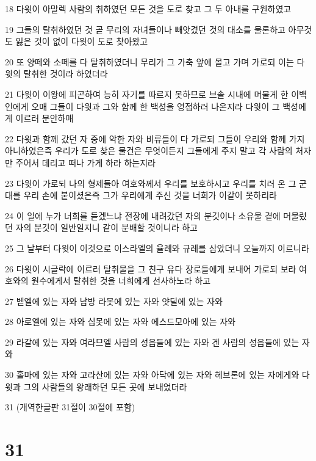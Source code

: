 \par 18 다윗이 아말렉 사람의 취하였던 모든 것을 도로 찾고 그 두 아내를 구원하였고
\par 19 그들의 탈취하였던 것 곧 무리의 자녀들이나 빼앗겼던 것의 대소를 물론하고 아무것도 잃은 것이 없이 다윗이 도로 찾아왔고
\par 20 또 양떼와 소떼를 다 탈취하였더니 무리가 그 가축 앞에 몰고 가며 가로되 이는 다윗의 탈취한 것이라 하였더라
\par 21 다윗이 이왕에 피곤하여 능히 자기를 따르지 못하므로 브솔 시내에 머물게 한 이백인에게 오매 그들이 다윗과 그와 함께 한 백성을 영접하러 나온지라 다윗이 그 백성에게 이르러 문안하매
\par 22 다윗과 함께 갔던 자 중에 악한 자와 비류들이 다 가로되 그들이 우리와 함께 가지 아니하였은즉 우리가 도로 찾은 물건은 무엇이든지 그들에게 주지 말고 각 사람의 처자만 주어서 데리고 떠나 가게 하라 하는지라
\par 23 다윗이 가로되 나의 형제들아 여호와께서 우리를 보호하시고 우리를 치러 온 그 군대를 우리 손에 붙이셨은즉 그가 우리에게 주신 것을 너희가 이같이 못하리라
\par 24 이 일에 누가 너희를 듣겠느냐 전장에 내려갔던 자의 분깃이나 소유물 곁에 머물렀던 자의 분깃이 일반일지니 같이 분배할 것이니라 하고
\par 25 그 날부터 다윗이 이것으로 이스라엘의 율례와 규례를 삼았더니 오늘까지 이르니라
\par 26 다윗이 시글락에 이르러 탈취물을 그 친구 유다 장로들에게 보내어 가로되 보라 여호와의 원수에게서 탈취한 것을 너희에게 선사하노라 하고
\par 27 벧엘에 있는 자와 남방 라못에 있는 자와 얏딜에 있는 자와
\par 28 아로엘에 있는 자와 십못에 있는 자와 에스드모아에 있는 자와
\par 29 라갈에 있는 자와 여라므엘 사람의 성읍들에 있는 자와 겐 사람의 성읍들에 있는 자와
\par 30 홀마에 있는 자와 고라산에 있는 자와 아닥에 있는 자와 헤브론에 있는 자에게와 다윗과 그의 사람들의 왕래하던 모든 곳에 보내었더라
\par 31 (개역한글판 31절이 30절에 포함)

\chapter{31}

